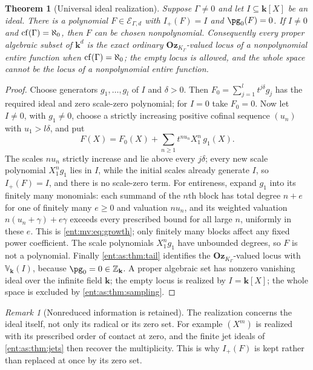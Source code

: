 \documentclass[11pt]{article}
\newtheorem{theorem}{Theorem}[section]
\theoremstyle{plain}
\theoremstyle{plain}
\theoremstyle{plain}
\theoremstyle{definition}
\theoremstyle{definition}
\theoremstyle{definition}
\theoremstyle{definition}
\theoremstyle{remark}
\newtheorem{remark}[remark]{Remark}
\newcommand{\K}{K_\Gamma}\newcommand{\KD}{K_\Delta}
\newcommand{\kk}{\mathbf k}\newcommand{\PP}{\mathbb P}
\newcommand{\Oz}{\mathbf{Oz}}\newcommand{\Ed}{\mathcal E_{\Gamma,d}}
\newcommand{\Zk}{\Z_{\kk}}\newcommand{\OzK}{\Oz_{\K}}
\begin{document}
\begin{theorem}[Universal ideal realization]\label{ent:as:thm:realization}
Suppose $\Gamma\ne0$ and let $I\subseteq\kk[X]$ be an ideal. There is a
polynomial $F\in\Ed$ with $I_+(F)=I$ and $\pg_0(F)=0$. If $I\ne0$ and
$\operatorname{cf}(\Gamma)=\aleph_0$, then $F$ can be chosen nonpolynomial. Consequently
every proper algebraic subset of $\kk^d$ is the exact ordinary $\OzK$-valued
locus of a nonpolynomial entire function when $\operatorname{cf}(\Gamma)=\aleph_0$; the empty
locus is allowed, and the whole space cannot be the locus of a nonpolynomial
entire function.
\end{theorem}
\begin{proof}
Choose generators $g_1,\ldots,g_l$ of $I$ and $\delta>0$. Then
$F_0=\sum_{j=1}^lt^{j\delta}g_j$ has the required ideal and zero scale-zero
polynomial; for $I=0$ take $F_0=0$. Now let $I\ne0$, with $g_1\ne0$, choose a
strictly increasing positive cofinal sequence $(u_n)$ with $u_1>l\delta$, and
put
\begin{equation}\label{ent:as:eq:realization}
 F(X)=F_0(X)+\sum_{n\ge1}t^{nu_n}X_1^n\,g_1(X).
\end{equation}
The scales $nu_n$ strictly increase and lie above every $j\delta$; every new
scale polynomial $X_1^ng_1$ lies in $I$, while the initial scales already
generate $I$, so $I_+(F)=I$, and there is no scale-zero term. For entireness,
expand $g_1$ into its finitely many monomials: each summand of the $n$th block
has total degree $n+e$ for one of finitely many $e\ge0$ and valuation $nu_n$,
and its weighted valuation $n(u_n+\gamma)+e\gamma$ exceeds every prescribed
bound for all large $n$, uniformly in these $e$. This is
\eqref{ent:mv:eq:growth}; only finitely many blocks affect any fixed power
coefficient. The scale polynomials $X_1^ng_1$ have unbounded degrees, so $F$ is
not a polynomial. Finally \cref{ent:as:thm:tail} identifies the $\OzK$-valued
locus with $\mathbb V_\kk(I)$, because $\pg_0=0\in\Zk$. A proper algebraic set
has nonzero vanishing ideal over the infinite field $\kk$; the empty locus is
realized by $I=\kk[X]$; the whole space is excluded by
\cref{ent:as:thm:sampling}.
\end{proof}

\begin{remark}[Nonreduced information is retained]\label{ent:as:rem:nonreduced}
The realization concerns the ideal itself, not only its radical or its zero
set. For example $(X^m)$ is realized with its prescribed order of contact at
zero, and the finite jet ideals of \cref{ent:as:thm:jets} then recover the
multiplicity. This is why $I_+(F)$ is kept rather than replaced at once by its
zero set.
\end{remark}
\end{document}
